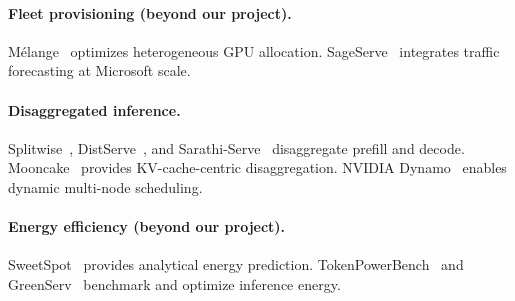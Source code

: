 \paragraph{Fleet provisioning (beyond our project).}
M\'{e}lange~\cite{griggs2024melange} optimizes heterogeneous GPU
allocation.  SageServe~\cite{jia2025sageserve} integrates traffic
forecasting at Microsoft scale.

\paragraph{Disaggregated inference.}
Splitwise~\cite{patel2024splitwise},
DistServe~\cite{zhong2024distserve}, and
Sarathi-Serve~\cite{agrawal2024sarathi} disaggregate prefill and
decode.  Mooncake~\cite{qin2025mooncake} provides KV-cache-centric
disaggregation.  NVIDIA Dynamo~\cite{nvidia2026dynamo} enables
dynamic multi-node scheduling.

\paragraph{Energy efficiency (beyond our project).}
SweetSpot~\cite{patel2026sweetspot} provides analytical energy
prediction.  TokenPowerBench~\cite{niu2025tokenpowerbench} and
GreenServ~\cite{greenserv2026} benchmark and optimize
inference energy.



